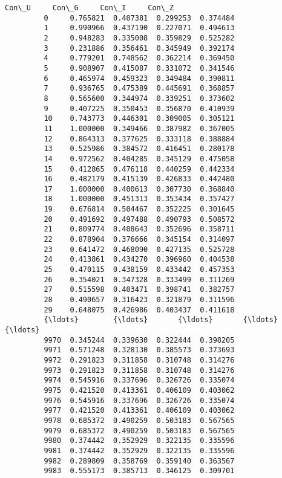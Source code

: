 \documentclass[11pt]{article}
\begin{document}
\begin{Verbatim}[commandchars=\\\{\}]
                  Con\_U     Con\_G     Con\_I     Con\_Z  
         0     0.765821  0.407381  0.299253  0.374484  
         1     0.990966  0.437190  0.227071  0.494613  
         2     0.948283  0.335008  0.359829  0.525282  
         3     0.231886  0.356461  0.345949  0.392174  
         4     0.779201  0.748562  0.362214  0.369450  
         5     0.908907  0.415087  0.331072  0.341546  
         6     0.465974  0.459323  0.349484  0.390811  
         7     0.936765  0.475389  0.445691  0.368857  
         8     0.565600  0.344974  0.339251  0.373602  
         9     0.407225  0.350453  0.356870  0.410939  
         10    0.743773  0.446301  0.309005  0.305121  
         11    1.000000  0.349466  0.387982  0.367005  
         12    0.864313  0.377625  0.333118  0.388884  
         13    0.525986  0.384572  0.416451  0.280178  
         14    0.972562  0.404285  0.345129  0.475058  
         15    0.412865  0.476118  0.440259  0.442334  
         16    0.482179  0.415139  0.426833  0.442480  
         17    1.000000  0.400613  0.307730  0.368840  
         18    1.000000  0.451313  0.353434  0.357427  
         19    0.676814  0.504467  0.352225  0.301645  
         20    0.491692  0.497488  0.490793  0.508572  
         21    0.809774  0.408643  0.352696  0.358711  
         22    0.878904  0.376666  0.345154  0.314097  
         23    0.641472  0.468090  0.427135  0.525728  
         24    0.413861  0.434270  0.396960  0.404538  
         25    0.470115  0.438159  0.433442  0.457353  
         26    0.354021  0.347328  0.333499  0.311269  
         27    0.515598  0.403471  0.398741  0.382757  
         28    0.490657  0.316423  0.321879  0.311596  
         29    0.648075  0.426986  0.403437  0.411618  
         {\ldots}        {\ldots}       {\ldots}       {\ldots}       {\ldots}  
         9970  0.345244  0.339630  0.322444  0.398205  
         9971  0.571248  0.328130  0.385573  0.373693  
         9972  0.291823  0.311858  0.310748  0.314276  
         9973  0.291823  0.311858  0.310748  0.314276  
         9974  0.545916  0.337696  0.326726  0.335074  
         9975  0.421520  0.413361  0.406109  0.403062  
         9976  0.545916  0.337696  0.326726  0.335074  
         9977  0.421520  0.413361  0.406109  0.403062  
         9978  0.685372  0.490259  0.503183  0.567565  
         9979  0.685372  0.490259  0.503183  0.567565  
         9980  0.374442  0.352929  0.322135  0.335596  
         9981  0.374442  0.352929  0.322135  0.335596  
         9982  0.289809  0.358769  0.359140  0.363567  
         9983  0.555173  0.385713  0.346125  0.309701  

\end{Verbatim}
\end{document}
